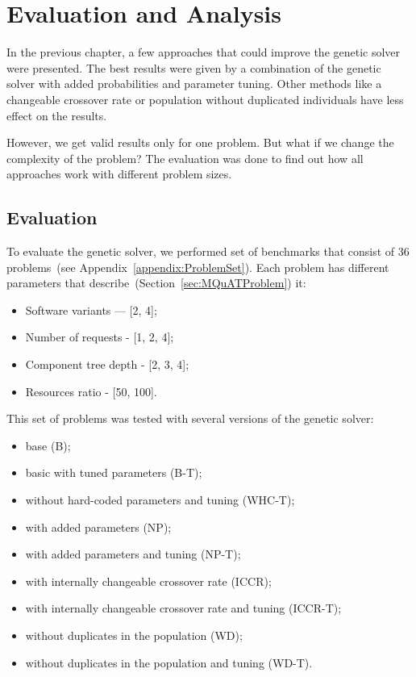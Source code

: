 \chapter{Evaluation and Analysis}
\label{chapter:evaluationAnalysis}

In the previous chapter, a few approaches that could improve the genetic solver were presented.
The best results were given by a combination of the genetic solver with added probabilities and parameter tuning.
Other methods like a changeable crossover rate or population without duplicated individuals have less effect on the results.

However, we get valid results only for one problem. But what if we change the complexity of the problem? The evaluation was done to find out how all approaches work with different problem sizes. 

\section{Evaluation}
\label{sec:evaluation}

To evaluate the genetic solver, we performed set of benchmarks that consist of 36 problems~(see Appendix~\ref{appendix:ProblemSet}). Each problem has different parameters that describe~(Section~\ref{sec:MQuATProblem}) it:

\begin{itemize}
	\item Software variants — [2, 4];
	\item Number of requests - [1, 2, 4];
	\item Component tree depth - [2, 3, 4];
	\item  Resources ratio - [50, 100].
\end{itemize}

This set of problems was tested with several versions of the genetic solver:

\begin{itemize}
	\item base (B);
	\item basic with tuned parameters (B-T);
	\item without hard-coded parameters and tuning (WHC-T);
	\item with added parameters (NP);
	\item with added parameters and tuning (NP-T);
	\item with internally changeable crossover rate (ICCR);
	\item with internally changeable crossover rate and tuning (ICCR-T);
	\item without duplicates in the population (WD);
	\item without duplicates in the population and tuning (WD-T).
\end{itemize}

